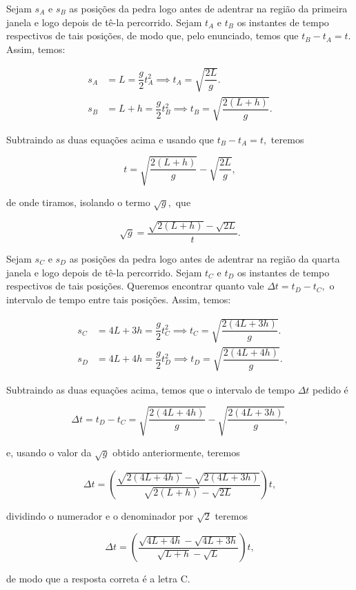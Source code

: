 \begin{exemplo}
Sejam $s_{A}$ e $s_{B}$ as posições da pedra logo antes de adentrar na região da primeira janela e logo depois de tê-la percorrido. Sejam $t_A$ e $t_B$ os instantes de tempo respectivos de tais posições, de modo que, pelo enunciado, temos que $t_B - t_A = t.$ Assim, temos:

\begin{align}
    s_A &= L = \dfrac{g}{2}t_A^2 \implies t_A = \sqrt{\dfrac{2L}{g}}. \nonumber \\
    s_B &= L+h = \dfrac{g}{2}t_B^2 \implies t_B = \sqrt{\dfrac{2(L+h)}{g}}. \nonumber 
\end{align}

Subtraindo as duas equações acima e usando que $t_B - t_A = t,$ teremos

$$ t =  \sqrt{\dfrac{2(L+h)}{g}} - \sqrt{\dfrac{2L}{g}},$$

\noindent de onde tiramos, isolando o termo $\sqrt g,$ que

$$ \sqrt g = \dfrac{\sqrt{2(L+h)}-\sqrt {2L}}{t}.$$

Sejam $s_{C}$ e $s_{D}$ as posições da pedra logo antes de adentrar na região da quarta janela e logo depois de tê-la percorrido. Sejam $t_C$ e $t_D$ os instantes de tempo respectivos de tais posições. Queremos encontrar quanto vale $\Delta t =t_D - t_C,$ o intervalo de tempo entre tais posições. Assim, temos:

\begin{align}
    s_C &= 4L+3h = \dfrac{g}{2}t_C^2 \implies t_C = \sqrt{\dfrac{2(4L+3h)}{g}}. \nonumber \\
    s_D &= 4L+4h = \dfrac{g}{2}t_D^2 \implies t_D = \sqrt{\dfrac{2(4L+4h)}{g}}. \nonumber 
\end{align}

Subtraindo as duas equações acima, temos que o intervalo de tempo $\Delta t$ pedido é

$$ \Delta t = t_D - t_C =\sqrt{\dfrac{2(4L+4h)}{g}} - \sqrt{\dfrac{2(4L+3h)}{g}},$$

\noindent e, usando o valor da $\sqrt g$ obtido anteriormente, teremos

$$ \Delta t = \left( \dfrac{\sqrt{2(4L+4h)} -\sqrt{2(4L+3h)}}{\sqrt{2(L+h)} - \sqrt{2L}} \right) t,$$

\noindent dividindo o numerador e o denominador por $\sqrt 2$ teremos

$$ \Delta t = \left( \dfrac{\sqrt{4L+4h} -\sqrt{4L+3h}}{\sqrt{L+h} - \sqrt{L}} \right) t,$$

\noindent de modo que a resposta correta é a letra C.
  

\end{exemplo}

